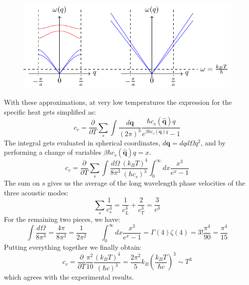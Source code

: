 \documentclass[10.75pt,a4paper,openright,bottom=2cm]{article}
\renewcommand{\Vec}[1]{\boldsymbol{#1}}
\begin{document}
\begin{figure}[h]
    \centering
    \includegraphics{simplifications.pdf}
    \label{fig:simplifications}
\end{figure}
With these approximations, at very low temperatures the expression for the specific heat gets simplified as:
\[
c_v=\frac{\partial}{\partial T}\sum_s\int\frac{d\Vec{q}}{(2\pi)^3}\frac{\hbar c_s(\hat{\Vec{q}})q}{e^{\beta\hbar c_s(\hat{\Vec{q}})q}-1}
\]
The integral gets evaluated in spherical coordinates, $d\Vec{q}=dqd\Omega q^2$, and by performing a change of variables $\beta\hbar c_s(\hat{\Vec{q}})q=x$.
\[
c_v=\frac{\partial}{\partial T}\sum_s\int\frac{d\Omega}{8\pi^3}\frac{(k_BT)^4}{(\hbar c_s)^3}\int_0^\infty dx\frac{x^3}{e^x-1}
\]
The sum on $s$ gives us the average of the long wavelength phase velocities of the three acoustic modes:
\[
\sum_s\frac{1}{c_s^3}=\frac{1}{c_L^3}+\frac{2}{c_T^3}=\frac{3}{c^3}
\]
For the remaining two pieces, we have:
\[
\int\frac{d\Omega}{8\pi^3}=\frac{4\pi}{8\pi^3}=\frac{1}{2\pi^2} \qquad \int_0^\infty dx\frac{x^3}{e^x-1}=\Gamma(4)\zeta(4)=3!\frac{\pi^4}{90}=\frac{\pi^4}{15}
\]
Putting everything together we finally obtain:
\[
c_v=\frac{\partial}{\partial T}\frac{\pi^2}{10}\frac{(k_BT)^4}{(\hbar c)^3}=\frac{2\pi^2}{5}k_B\left(\frac{k_BT}{\hbar c}\right)^3\sim T^3
\]
which agrees with the experimental results.
\end{document}
